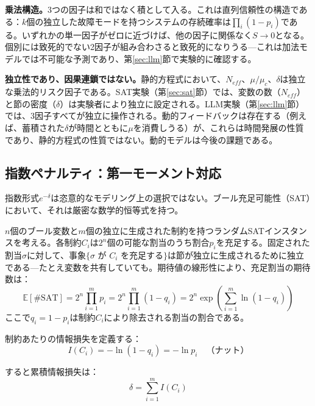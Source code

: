 \documentclass[11pt,a4paper]{article}
\begin{document}
\textbf{乗法構造。}3つの因子は和ではなく積として入る。これは直列信頼性\cite{barlow1975}の構造である：$k$個の独立した故障モードを持つシステムの存続確率は$\prod_i (1 - p_i)$である。いずれかの単一因子がゼロに近づけば、他の因子に関係なく$S \to 0$となる。個別には致死的でない2因子が組み合わさると致死的になりうる---これは加法モデルでは不可能な予測であり、第\ref{sec:llm}節で実験的に確認する。

\textbf{独立性であり、因果連鎖ではない。}静的方程式において、$N_{eff}$、$\mu/\mu_c$、$\delta$は独立な乗法的リスク因子である。SAT実験（第\ref{sec:sat}節）では、変数の数（$N_{eff}$）と節の密度（$\delta$）は実験者により独立に設定される。LLM実験（第\ref{sec:llm}節）では、3因子すべてが独立に操作される。動的フィードバックは存在する（例えば、蓄積された$\delta$が時間とともに$\mu$を消費しうる）が、これらは時間発展の性質であり、静的方程式の性質ではない。動的モデルは今後の課題である。

\subsection{指数ペナルティ：第一モーメント対応}
\label{sec:first-moment}

指数形式$e^{-\delta}$は恣意的なモデリング上の選択ではない。ブール充足可能性（SAT）において、それは厳密な数学的恒等式を持つ。

$n$個のブール変数と$m$個の独立に生成された制約を持つランダムSATインスタンスを考える。各制約$C_i$は$2^n$個の可能な割当のうち割合$p_i$を充足する。固定された割当$\sigma$に対して、事象$\{\sigma \text{ が } C_i \text{ を充足する}\}$は節が独立に生成されるために独立である---たとえ変数を共有していても。期待値の線形性により、充足割当の期待数は：
\begin{equation}
\mathbb{E}[\#\text{SAT}] = 2^n \prod_{i=1}^{m} p_i = 2^n \prod_{i=1}^{m} (1 - q_i) = 2^n \exp\!\left(\sum_{i=1}^{m} \ln(1 - q_i)\right)
\label{eq:first-moment}
\end{equation}
ここで$q_i = 1 - p_i$は制約$C_i$により除去される割当の割合である。

制約あたりの情報損失を定義する：
\begin{equation}
I(C_i) = -\ln(1 - q_i) = -\ln p_i \quad \text{（ナット）}
\label{eq:info-loss}
\end{equation}

すると累積情報損失は：
\begin{equation}
\delta = \sum_{i=1}^{m} I(C_i)
\label{eq:delta-def}
\end{equation}
\end{document}
